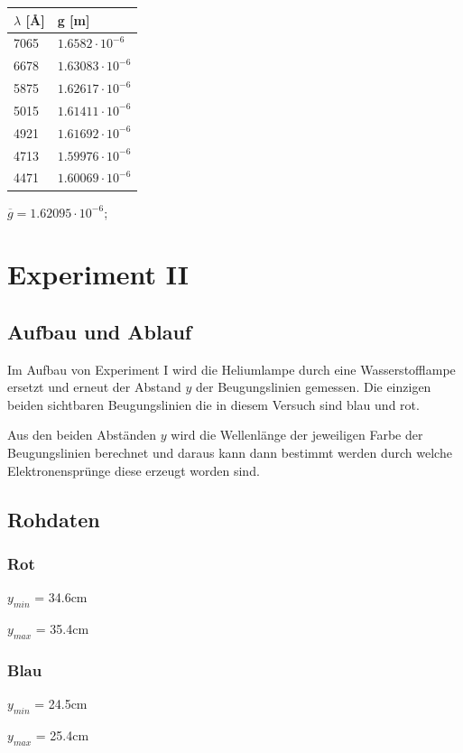 \documentclass[12pt,a4paper]{article}
\begin{document}
\begin{tabular}{|l|l|}
\hline
$\lambda$ [\AA]&g [m]\\
\hline
7065&$1.6582\cdot 10^{-6}$\\
6678&$1.63083\cdot 10^{-6}$\\
5875&$1.62617\cdot 10^{-6}$\\
5015&$1.61411\cdot 10^{-6}$\\
4921&$1.61692\cdot 10^{-6}$\\
4713&$1.59976\cdot 10^{-6}$\\
4471&$1.60069\cdot 10^{-6}$\\
\hline
\end{tabular}\vspace{10pt}

$\overline{g} = 1.62095\cdot 10^{-6}$;

\section*{Experiment II}

\subsection*{Aufbau und Ablauf}
Im Aufbau von Experiment I wird die Heliumlampe durch eine Wasserstofflampe ersetzt und erneut der Abstand $y$ der Beugungslinien gemessen. Die einzigen beiden sichtbaren Beugungslinien die in diesem Versuch sind blau und rot.

Aus den beiden Abst\"anden $y$ wird die Wellenl\"ange der jeweiligen Farbe der Beugungslinien berechnet und daraus kann dann bestimmt werden durch welche Elektronenspr\"unge diese erzeugt worden sind.

\subsection*{Rohdaten}
\subsubsection*{Rot}
$y_{min}$ = 34.6cm

$y_{max}$ = 35.4cm

\subsubsection*{Blau}
$y_{min}$ = 24.5cm

$y_{max}$ = 25.4cm
\end{document}

